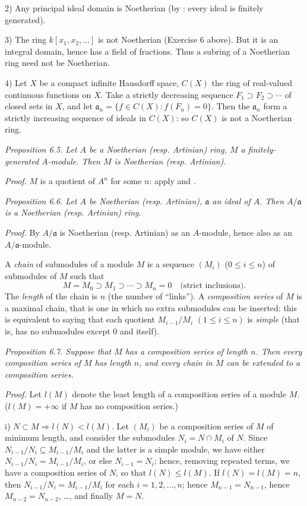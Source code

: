 2) Any principal ideal domain is Noetherian (by : every ideal is finitely generated).

3) The ring $k[x_1,x_2,\ldots]$ is not Noetherian (Exercise 6 above). But it is an integral domain, hence has a field of fractions. Thus a subring of a Noetherian ring need not be Noetherian.

4) Let $X$ be a compact infinite Hausdorff space, $C(X)$ the ring of real-valued continuous functions on $X$. Take a strictly decreasing sequence $F_1\supset F_2\supset\cdots$ of closed sets in $X$, and let $\mathfrak a_n=\{f\in C(X):f(F_n)=0\}$. Then the $\mathfrak a_n$ form a strictly increasing sequence of ideals in $C(X)$: so $C(X)$ is not a Noetherian ring.

\noindent\textit{Proposition 6.5. Let $A$ be a Noetherian (resp. Artinian) ring, $M$ a finitely-generated $A$-module. Then $M$ is Noetherian (resp. Artinian).}

\noindent\textit{Proof.} $M$ is a quotient of $A^n$ for some $n$: apply  and . \proofbox

\noindent\textit{Proposition 6.6. Let $A$ be Noetherian (resp. Artinian), $\mathfrak a$ an ideal of $A$. Then $A/\mathfrak a$ is a Noetherian (resp. Artinian) ring.}

\noindent\textit{Proof.} By  $A/\mathfrak a$ is Noetherian (resp. Artinian) as an $A$-module, hence also as an $A/\mathfrak a$-module. \proofbox

A \textit{chain} of submodules of a module $M$ is a sequence $(M_i)$ ($0\leq i\leq n$) of submodules of $M$ such that
\[
 M=M_0\supset M_1\supset\cdots\supset M_n=0\quad\text{(strict inclusions)}.
\]
The \textit{length} of the chain is $n$ (the number of ``links''). A \textit{composition series} of $M$ is a maximal chain, that is one in which no extra submodules can be inserted: this is equivalent to saying that each quotient $M_{i-1}/M_i$ $(1\leq i\leq n)$ is \textit{simple} (that is, has no submodules except $0$ and itself).

\noindent\textit{Proposition 6.7. Suppose that $M$ has a composition series of length $n$. Then every composition series of $M$ has length $n$, and every chain in $M$ can be extended to a composition series.}

\noindent\textit{Proof.} Let $l(M)$ denote the least length of a composition series of a module $M$. ($l(M)=+\infty$ if $M$ has no composition series.)

i) $N\subset M\Rightarrow l(N)<l(M)$. Let $(M_i)$ be a composition series of $M$ of minimum length, and consider the submodules $N_i=N\cap M_i$ of $N$. Since $N_{i-1}/N_i\subseteq M_{i-1}/M_i$ and the latter is a simple module, we have either $N_{i-1}/N_i=M_{i-1}/M_i$, or else $N_{i-1}=N_i$; hence, removing repeated terms, we have a composition series of $N$, so that $l(N)\leq l(M)$. If $l(N)=l(M)=n$, then $N_{i-1}/N_i=M_{i-1}/M_i$ for each $i=1,2,\ldots,n$; hence $M_{n-1}=N_{n-1}$, hence $M_{n-2}=N_{n-2}$, \ldots, and finally $M=N$.

